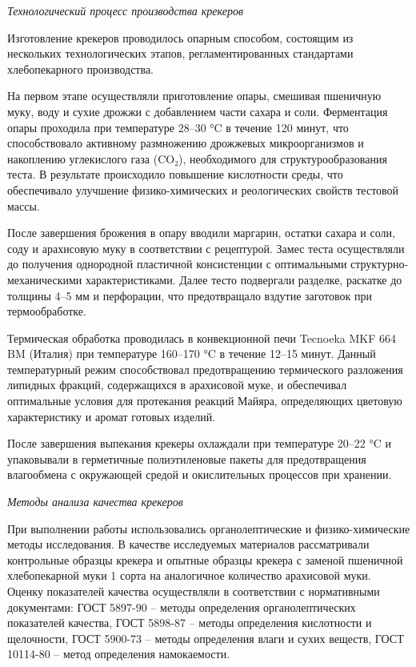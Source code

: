 \begin{multicols}{2}
\emph{Технологический процесс производства крекеров}

Изготовление крекеров проводилось опарным способом, состоящим из
нескольких технологических этапов, регламентированных стандартами
хлебопекарного производства.

На первом этапе осуществляли приготовление опары, смешивая пшеничную
муку, воду и сухие дрожжи с добавлением части сахара и соли. Ферментация
опары проходила при температуре 28--30 °C в течение 120 минут, что
способствовало активному размножению дрожжевых микроорганизмов и
накоплению углекислого газа (CO₂), необходимого для структурообразования
теста. В результате происходило повышение кислотности среды, что
обеспечивало улучшение физико-химических и реологических свойств
тестовой массы.

После завершения брожения в опару вводили маргарин, остатки сахара и
соли, соду и арахисовую муку в соответствии с рецептурой. Замес теста
осуществляли до получения однородной пластичной консистенции с
оптимальными структурно-механическими характеристиками. Далее тесто
подвергали разделке, раскатке до толщины 4--5 мм и перфорации, что
предотвращало вздутие заготовок при термообработке.

Термическая обработка проводилась в конвекционной печи Tecnoeka MKF 664
BM (Италия) при температуре 160--170 °C в течение 12--15 минут. Данный
температурный режим способствовал предотвращению термического разложения
липидных фракций, содержащихся в арахисовой муке, и обеспечивал
оптимальные условия для протекания реакций Майяра, определяющих цветовую
характеристику и аромат готовых изделий.

После завершения выпекания крекеры охлаждали при температуре 20--22 °C и
упаковывали в герметичные полиэтиленовые пакеты для предотвращения
влагообмена с окружающей средой и окислительных процессов при хранении.

\emph{Методы анализа качества крекеров}

При выполнении работы использовались органолептические и
физико-химические методы исследования. В качестве исследуемых материалов
рассматривали контрольные образцы крекера и опытные образцы крекера с
заменой пшеничной хлебопекарной муки 1 сорта на аналогичное количество
арахисовой муки. Оценку показателей качества осуществляли в соответствии
с нормативными документами: ГОСТ 5897-90 -- методы определения
органолептических показателей качества, ГОСТ 5898-87 -- методы
определения кислотности и щелочности, ГОСТ 5900-73 -- методы определения
влаги и сухих веществ, ГОСТ 10114-80 -- метод определения намокаемости.


\end{multicols}
